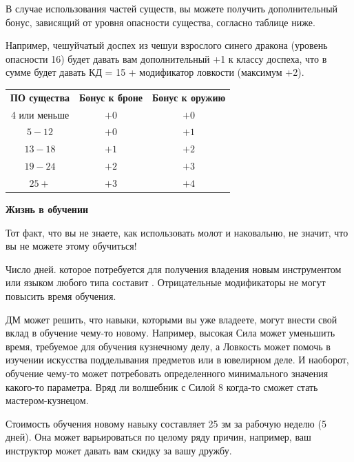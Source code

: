 \documentclass[a4paper, 9pt, twocolumn]{book}
\newenvironment {dndtable}
{
		\bigskip
		\centering
		\begin{tcolorbox}
			[enhanced, 
			sharp corners,
			colback=framecolor, 
			boxrule = 0pt, 
			overlay={
				\begin{tcbinvclipframe}
					\path[fill=black] ([xshift=10pt,yshift=7pt]frame.north west) --
					(frame.north west) --
					(frame.north east) --
					([xshift=-10pt, yshift=7pt]frame.north east) --
					([xshift=-10pt, yshift=2pt]frame.north east) --
					([xshift=10pt,yshift=2pt]frame.north west) -- cycle;
					
					\path[fill=black] ([xshift=10pt,yshift=-7pt]frame.south west) --
					(frame.south west) --
					(frame.south east) --
					([xshift=-10pt, yshift=-7pt]frame.south east) --
					([xshift=-10pt, yshift=-2pt]frame.south east) --
					([xshift=10pt,yshift=-2pt]frame.south west) -- cycle;
				\end{tcbinvclipframe}
			}
			]}
{\end{tcolorbox}}
\begin{document}
	В случае использования частей существ, вы можете получить дополнительный бонус, зависящий от уровня опасности существа, согласно таблице ниже.
	
	Например, чешуйчатый доспех из чешуи взрослого синего дракона (уровень опасности 16) будет давать вам дополнительный +1 к классу доспеха, что в сумме будет давать КД = 15 + модификатор ловкости (максимум +2).
	
	\begin{table}[H]
		\begin{tabularx}{\linewidth}{C C C}
			
			\textbf{ПО существа} & \textbf{Бонус к броне} & \textbf{Бонус к оружию} \\
			
			4 или меньше & $+0$ & $+0$ \\
			
			$5 - 12$ & $+0$ & $+1$ \\
			
			$13 - 18$ & $+1$ & $+2$ \\
			
			$19 - 24$ & $+2$ & $+3$ \\
			
			$25 + $ & $+3$ & $+4$ \\
			
		\end{tabularx}
	\end{table}
	
	
	\begin{dndtable}
		
		{\Large \textbf{Жизнь в обучении}}
		
		Тот факт, что вы не знаете, как использовать молот и наковальню, не значит, что вы не можете этому обучиться!
		
		Число дней. которое потребуется для получения владения новым инструментом или языком любого типа составит . Отрицательные модификаторы не могут повысить время обучения.
		
		ДМ может решить, что навыки, которыми вы уже владеете, могут внести свой вклад в обучение чему-то новому. Например, высокая Сила может уменьшить время, требуемое для обучения кузнечному делу, а Ловкость может помочь в изучении искусства подделывания предметов или в ювелирном деле. И наоборот, обучение чему-то может потребовать определенного минимального значения какого-то параметра. Вряд ли волшебник с Силой 8 когда-то сможет стать мастером-кузнецом.
		
		Стоимость обучения новому навыку составляет 25 зм за рабочую неделю (5 дней). Она может варьироваться по целому ряду причин, например, ваш инструктор может давать вам скидку за вашу дружбу.
		
	\end{dndtable}
	
\end{document}
